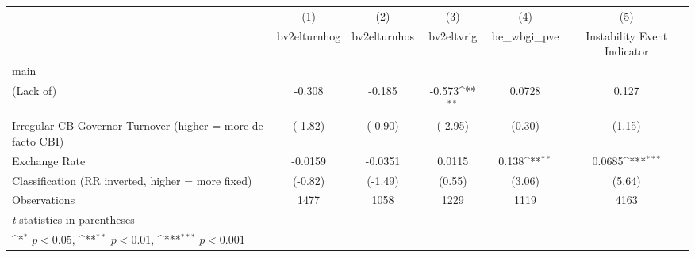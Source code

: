 {
\def\sym#1{\ifmmode^{#1}\else\(^{#1}\)\fi}
\begin{tabular}{l*{5}{c}}
\toprule
                &\multicolumn{1}{c}{(1)}&\multicolumn{1}{c}{(2)}&\multicolumn{1}{c}{(3)}&\multicolumn{1}{c}{(4)}&\multicolumn{1}{c}{(5)}\\
                &\multicolumn{1}{c}{bv2elturnhog}&\multicolumn{1}{c}{bv2elturnhos}&\multicolumn{1}{c}{bv2eltvrig}&\multicolumn{1}{c}{be\_wbgi\_pve}&\multicolumn{1}{c}{Instability Event Indicator}\\
\midrule
main            &                  &                  &                  &                  &                  \\
(Lack of)       &   -0.308         &   -0.185         &   -0.573\sym{**} &   0.0728         &    0.127         \\
Irregular CB Governor Turnover (higher = more de facto CBI)&  (-1.82)         &  (-0.90)         &  (-2.95)         &   (0.30)         &   (1.15)         \\
\addlinespace
Exchange Rate   &  -0.0159         &  -0.0351         &   0.0115         &    0.138\sym{**} &   0.0685\sym{***}\\
Classification (RR inverted, higher = more fixed)&  (-0.82)         &  (-1.49)         &   (0.55)         &   (3.06)         &   (5.64)         \\
\midrule
Observations    &     1477         &     1058         &     1229         &     1119         &     4163         \\
\bottomrule
\multicolumn{6}{l}{\footnotesize \textit{t} statistics in parentheses}\\
\multicolumn{6}{l}{\footnotesize \sym{*} \(p<0.05\), \sym{**} \(p<0.01\), \sym{***} \(p<0.001\)}\\
\end{tabular}
}
